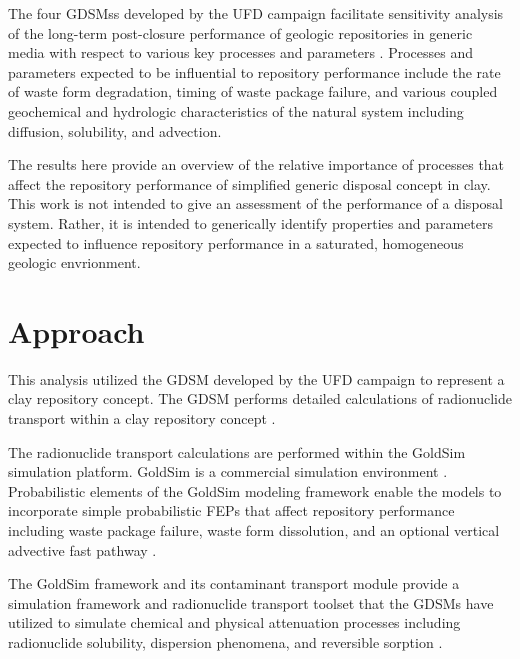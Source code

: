 
The four \glspl{GDSM}s developed by the \gls{UFD} campaign facilitate sensitivity 
analysis of the long-term post-closure performance of geologic repositories in 
generic media with respect to various key processes and parameters 
\cite{clayton_generic_2011}. Processes and parameters expected to be influential to repository 
performance  include the rate of waste form degradation, timing of waste package 
failure, and various coupled geochemical and hydrologic characteristics of the 
natural system including diffusion, solubility, and advection.

The results here provide an overview of the relative importance of processes 
that affect the repository performance of simplified generic disposal 
concept in clay. This work is not intended to give an assessment of the performance of a 
disposal system. Rather, it is intended to  
generically identify properties and parameters expected to influence repository 
performance in a saturated, homogeneous geologic envrionment.


\section{Approach}

This analysis utilized the \gls{GDSM} developed by the \gls{UFD} campaign to 
represent a clay repository concept. The \gls{GDSM} performs detailed 
calculations of radionuclide transport within a clay repository concept \cite{clayton_generic_2011}.  

The radionuclide transport calculations
are performed within the GoldSim simulation platform. GoldSim is a commercial 
simulation environment \cite{golder_goldsim_2010, golder_goldsim_ct_2010}.
Probabilistic elements of the GoldSim modeling framework enable the models to 
incorporate simple probabilistic \gls{FEPs} that affect repository performance 
including waste package failure, waste form dissolution, and an optional 
vertical advective fast pathway \cite{clayton_generic_2011}. 

The GoldSim framework and 
its contaminant transport module provide a simulation framework and 
radionuclide transport toolset that the \glspl{GDSM} have utilized to 
simulate chemical and physical attenuation processes including radionuclide 
solubility, dispersion phenomena, and reversible sorption 
\cite{golder_goldsim_2010, golder_goldsim_ct_2010}. 


